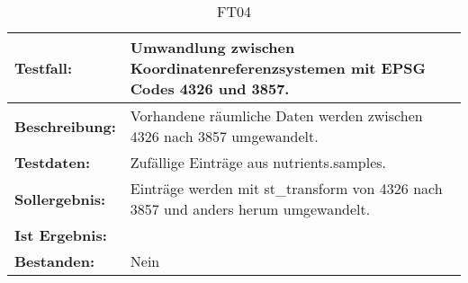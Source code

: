 \begin{table}[h!]
\centering
\small
\begin{tabular}{p{2.8cm}|p{12cm}}
\textbf{Testfall:} & Umwandlung zwischen Koordinatenreferenzsystemen mit EPSG Codes 4326 und 3857. \\ \hline
\textbf{Beschreibung:} & Vorhandene räumliche Daten werden zwischen 4326 nach 3857 umgewandelt. \\ \hline
\textbf{Testdaten:} & Zufällige Einträge aus nutrients.samples. \\ \hline
\textbf{Sollergebnis:} & Einträge werden mit st\_{}transform von 4326 nach 3857 und anders herum umgewandelt. \\ \hline
\textbf{Ist Ergebnis:} &  \\ \hline
\textbf{Bestanden:} & Nein \\
\end{tabular}
\caption*{FT04}
\end{table}

\capstarttrue